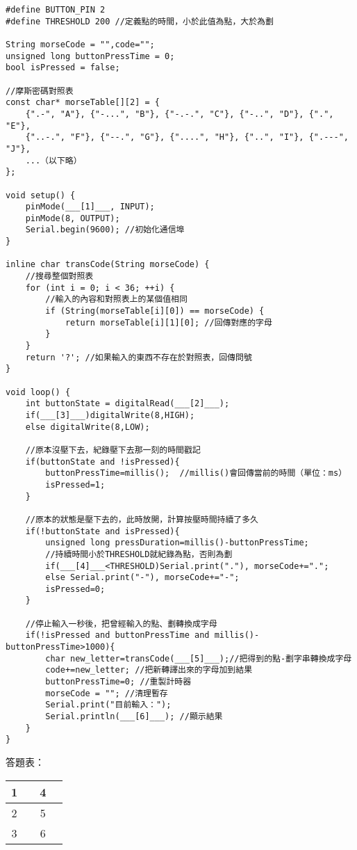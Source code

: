 \documentclass[12pt,a4paper]{article}
\begin{document}
\begin{lstlisting}
#define BUTTON_PIN 2
#define THRESHOLD 200 //定義點的時間，小於此值為點，大於為劃

String morseCode = "",code="";
unsigned long buttonPressTime = 0;
bool isPressed = false;

//摩斯密碼對照表
const char* morseTable[][2] = {
    {".-", "A"}, {"-...", "B"}, {"-.-.", "C"}, {"-..", "D"}, {".", "E"},
    {"..-.", "F"}, {"--.", "G"}, {"....", "H"}, {"..", "I"}, {".---", "J"},
    ...（以下略）
};

void setup() {
    pinMode(___[1]___, INPUT);
    pinMode(8, OUTPUT);
    Serial.begin(9600); //初始化通信埠
}

inline char transCode(String morseCode) {
    //搜尋整個對照表
    for (int i = 0; i < 36; ++i) {
        //輸入的內容和對照表上的某個值相同
        if (String(morseTable[i][0]) == morseCode) {
            return morseTable[i][1][0]; //回傳對應的字母
        }
    }
    return '?'; //如果輸入的東西不存在於對照表，回傳問號
}

void loop() {
    int buttonState = digitalRead(___[2]___);
    if(___[3]___)digitalWrite(8,HIGH);
    else digitalWrite(8,LOW);

    //原本沒壓下去，紀錄壓下去那一刻的時間戳記
    if(buttonState and !isPressed){
        buttonPressTime=millis();  //millis()會回傳當前的時間（單位：ms）
        isPressed=1;
    }
    
    //原本的狀態是壓下去的，此時放開，計算按壓時間持續了多久
    if(!buttonState and isPressed){
        unsigned long pressDuration=millis()-buttonPressTime;
        //持續時間小於THRESHOLD就紀錄為點，否則為劃
        if(___[4]___<THRESHOLD)Serial.print("."), morseCode+=".";
        else Serial.print("-"), morseCode+="-";
        isPressed=0;
    }
    
    //停止輸入一秒後，把曾經輸入的點、劃轉換成字母
    if(!isPressed and buttonPressTime and millis()-buttonPressTime>1000){
        char new_letter=transCode(___[5]___);//把得到的點-劃字串轉換成字母
        code+=new_letter; //把新轉譯出來的字母加到結果
        buttonPressTime=0; //重製計時器
        morseCode = ""; //清理暫存
        Serial.print("目前輸入：");
        Serial.println(___[6]___); //顯示結果
    }
}
\end{lstlisting}

答題表：
\begin{table}[h!]
\centering
\begin{tabular}{|c|p{7cm}|c|p{7cm}|}
\hline
1 &  & 4 & \\ \hline
2 &  & 5 & \\ \hline
3 &  & 6 & \\ \hline
\end{tabular}
\end{table}
\end{document}
